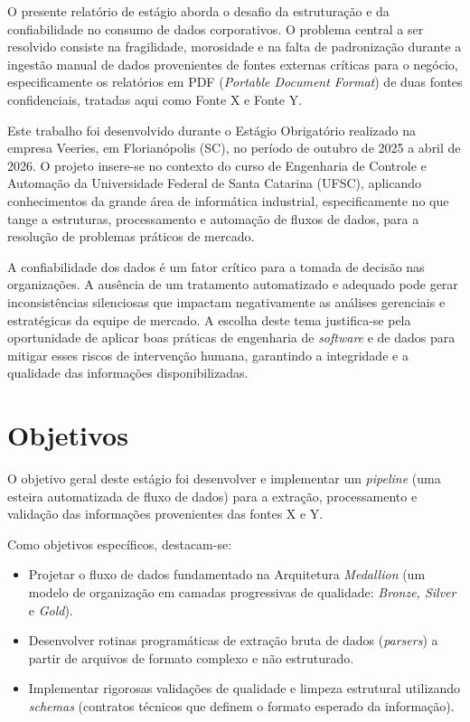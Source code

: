 O presente relatório de estágio aborda o desafio da estruturação e da confiabilidade no consumo de dados corporativos. O problema central a ser resolvido consiste na fragilidade, morosidade e na falta de padronização durante a ingestão manual de dados provenientes de fontes externas críticas para o negócio, especificamente os relatórios em PDF (\textit{Portable Document Format}) de duas fontes confidenciais, tratadas aqui como Fonte X e Fonte Y.

Este trabalho foi desenvolvido durante o Estágio Obrigatório realizado na empresa Veeries, em Florianópolis (SC), no período de outubro de 2025 a abril de 2026. O projeto insere-se no contexto do curso de Engenharia de Controle e Automação da Universidade Federal de Santa Catarina (UFSC), aplicando conhecimentos da grande área de informática industrial, especificamente no que tange a estruturas, processamento e automação de fluxos de dados, para a resolução de problemas práticos de mercado.

A confiabilidade dos dados é um fator crítico para a tomada de decisão nas organizações. A ausência de um tratamento automatizado e adequado pode gerar inconsistências silenciosas que impactam negativamente as análises gerenciais e estratégicas da equipe de mercado. A escolha deste tema justifica-se pela oportunidade de aplicar boas práticas de engenharia de \textit{software} e de dados para mitigar esses riscos de intervenção humana, garantindo a integridade e a qualidade das informações disponibilizadas.

\section{Objetivos}
O objetivo geral deste estágio foi desenvolver e implementar um \textit{pipeline} (uma esteira automatizada de fluxo de dados) para a extração, processamento e validação das informações provenientes das fontes X e Y. 

Como objetivos específicos, destacam-se:
\begin{itemize}
    \item Projetar o fluxo de dados fundamentado na Arquitetura \textit{Medallion} (um modelo de organização em camadas progressivas de qualidade: \textit{Bronze, Silver} e \textit{Gold}).
    \item Desenvolver rotinas programáticas de extração bruta de dados (\textit{parsers}) a partir de arquivos de formato complexo e não estruturado.
    \item Implementar rigorosas validações de qualidade e limpeza estrutural utilizando \textit{schemas} (contratos técnicos que definem o formato esperado da informação).
\end{itemize}

